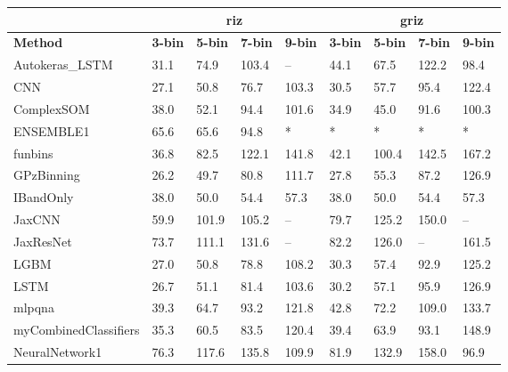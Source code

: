 \documentclass[twocolumn,twocolappendix]{aastex63}
\begin{document}
\begin{table}[]
\begin{tabular}{|l|llll|llll|}
                & \multicolumn{4}{c|}{\textbf{riz}}      & \multicolumn{4}{c|}{\textbf{griz}}                                \\ \hline
\textbf{Method} & \textbf{3-bin} & \textbf{5-bin} & \textbf{7-bin} & \textbf{9-bin} & \textbf{3-bin} & \textbf{5-bin} & \textbf{7-bin} & \textbf{9-bin} \\ \hline
{\sc Autokeras\_LSTM } & 31.1 & 74.9    & 103.4    & --    & 44.1             & 67.5             & 122.2             & 98.4\\
{\sc CNN } & 27.1 & 50.8    & 76.7    & 103.3    & 30.5             & 57.7             & 95.4             & 122.4\\
{\sc ComplexSOM } & 38.0 & 52.1    & 94.4    & 101.6    & 34.9             & 45.0             & 91.6             & 100.3\\
{\sc ENSEMBLE1 } & 65.6 & 65.6    & 94.8    & *    & *             & *             & *             & *\\
{\sc funbins } & 36.8 & 82.5    & 122.1    & 141.8    & 42.1             & 100.4             & 142.5             & 167.2\\
{\sc GPzBinning } & 26.2 & 49.7    & 80.8    & 111.7    & 27.8             & 55.3             & 87.2             & 126.9\\
{\sc IBandOnly } & 38.0 & 50.0    & 54.4    & 57.3    & 38.0             & 50.0             & 54.4             & 57.3\\
{\sc JaxCNN } & 59.9 & 101.9    & 105.2    & --    & 79.7             & 125.2             & 150.0             & --\\
{\sc JaxResNet } & 73.7 & 111.1    & 131.6    & --    & 82.2             & 126.0             & --             & 161.5\\
{\sc LGBM } & 27.0 & 50.8    & 78.8    & 108.2    & 30.3             & 57.4             & 92.9             & 125.2\\
{\sc LSTM } & 26.7 & 51.1    & 81.4    & 103.6    & 30.2             & 57.1             & 95.9             & 126.9\\
{\sc mlpqna } & 39.3 & 64.7    & 93.2    & 121.8    & 42.8             & 72.2             & 109.0             & 133.7\\
{\sc myCombinedClassifiers } & 35.3 & 60.5    & 83.5    & 120.4    & 39.4             & 63.9             & 93.1             & 148.9\\
{\sc NeuralNetwork1 } & 76.3 & 117.6    & 135.8    & 109.9    & 81.9             & 132.9             & 158.0             & 96.9\\

\end{tabular}
\end{table}
\end{document}
